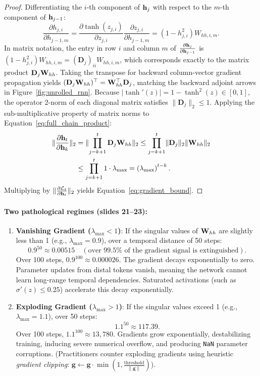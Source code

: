 \documentclass[../../main.tex]{subfiles}
\begin{document}
\begin{proof}
Differentiating the $i$-th component of $\mathbf{h}_j$ with respect to the $m$-th component of $\mathbf{h}_{j-1}$:
\[
\frac{\partial h_{j, i}}{\partial h_{j-1, m}} = \frac{\partial \tanh(z_{j, i})}{\partial z_{j, i}} \frac{\partial z_{j, i}}{\partial h_{j-1, m}} = (1 - h_{j, i}^2) W_{hh, i, m}.
\]
In matrix notation, the entry in row $i$ and column $m$ of $\frac{\partial \mathbf{h}_j}{\partial \mathbf{h}_{j-1}}$ is $(1 - h_{j, i}^2) W_{hh, i, m} = (\mathbf{D}_j)_{ii} W_{hh, i, m}$, which corresponds exactly to the matrix product $\mathbf{D}_j \mathbf{W}_{hh}$.
Taking the transpose for backward column-vector gradient propagation yields $(\mathbf{D}_j \mathbf{W}_{hh})^\top = \mathbf{W}_{hh}^\top \mathbf{D}_j$, matching the backward adjoint arrows in Figure~\ref{fig:unrolled_rnn}.
Because $|\tanh'(z)| = 1 - \tanh^2(z) \in [0, 1]$, the operator 2-norm of each diagonal matrix satisfies $\|\mathbf{D}_j\|_2 \le 1$. Applying the sub-multiplicative property of matrix norms to Equation~\eqref{eq:full_chain_product}:
\begin{align*}
\lVert\frac{\partial \mathbf{h}_t}{\partial \mathbf{h}_k}\rVert_2 &= \lVert\prod_{j=k+1}^t \mathbf{D}_j \mathbf{W}_{hh}\rVert_2 \le \prod_{j=k+1}^t \lVert\mathbf{D}_j\rVert_2 \lVert\mathbf{W}_{hh}\rVert_2 \\
&\le \prod_{j=k+1}^t 1 \cdot \lambda_{\max} = \left( \lambda_{\max} \right)^{t-k}.
\end{align*}
Multiplying by $\lVert\frac{\partial \mathcal{L}_t}{\partial \mathbf{h}_t}\rVert_2$ yields Equation~\eqref{eq:gradient_bound}.
\end{proof}

\paragraph{Two pathological regimes (slides 21--23):}
\begin{enumerate}
    \item \textbf{Vanishing Gradient ($\lambda_{\max} < 1$)}: If the singular values of $\mathbf{W}_{hh}$ are slightly less than 1 (e.g., $\lambda_{\max} = 0.9$), over a temporal distance of 50 steps:
    \[
    0.9^{50} \approx 0.00515 \quad (\text{over } 99.5\% \text{ of the gradient signal is extinguished}).
    \]
    Over 100 steps, $0.9^{100} \approx 0.000026$. The gradient decays exponentially to zero. Parameter updates from distal tokens vanish, meaning the network cannot learn long-range temporal dependencies. Saturated activations (such as $\sigma'(z) \le 0.25$) accelerate this decay exponentially.
    \item \textbf{Exploding Gradient ($\lambda_{\max} > 1$)}: If the singular values exceed 1 (e.g., $\lambda_{\max} = 1.1$), over 50 steps:
    \[
    1.1^{50} \approx 117.39.
    \]
    Over 100 steps, $1.1^{100} \approx 13{,}780$. Gradients grow exponentially, destabilizing training, inducing severe numerical overflow, and producing \texttt{NaN} parameter corruptions. (Practitioners counter exploding gradients using heuristic \emph{gradient clipping}: $\mathbf{g} \leftarrow \mathbf{g} \cdot \min(1, \frac{\text{threshold}}{\|\mathbf{g}\|})$).
\end{enumerate}
\end{document}
